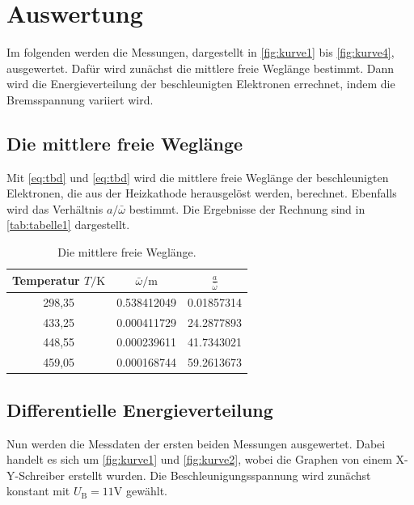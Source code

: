 \section{Auswertung}
\label{sec:Auswertung}

Im folgenden werden die Messungen, dargestellt in \autoref{fig:kurve1} bis \autoref{fig:kurve4}, ausgewertet.
Dafür wird zunächst die mittlere freie Weglänge bestimmt.
Dann wird die Energieverteilung der beschleunigten Elektronen errechnet, indem die Bremsspannung variiert wird.


\subsection{Die mittlere freie Weglänge}
Mit \autoref{eq:tbd} und \autoref{eq:tbd} wird die mittlere freie Weglänge der beschleunigten Elektronen,
die aus der Heizkathode herausgelöst werden, berechnet.
Ebenfalls wird das Verhältnis $a / \bar{\omega}$ bestimmt.
Die Ergebnisse der Rechnung sind in \autoref{tab:tabelle1} dargestellt.

\begin{table} [H]
  \centering
  \caption{Die mittlere freie Weglänge.}
  \label{tab:tabelle1}
  \begin{tabular}{c c c}
      \toprule
      Temperatur $T / \unit\kelvin$ & $\bar{\omega} / \unit\meter$ & $\frac{a}{\bar{\omega}}$ \\
      \midrule 
      298,35 & 0.538412049 & 0.01857314\\
      433,25 & 0.000411729 & 24.2877893\\
      448,55 & 0.000239611 & 41.7343021\\
      459,05 & 0.000168744 & 59.2613673\\
      \bottomrule
  \end{tabular}
\end{table}

\subsection{Differentielle Energieverteilung}
Nun werden die Messdaten der ersten beiden Messungen ausgewertet.
Dabei handelt es sich um \autoref{fig:kurve1} und \autoref{fig:kurve2}, wobei die Graphen von einem X-Y-Schreiber erstellt wurden.
Die Beschleunigungsspannung wird zunächst konstant mit $U_\text{B} = 11 \unit\V$ gewählt.


